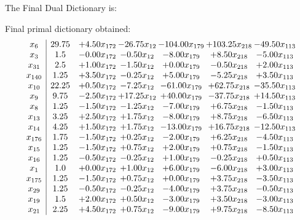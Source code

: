 \documentclass[8pt]{article}
\begin{document}
The Final Dual Dictionary is: 

 Final primal dictionary obtained: 
\[\begin{array}{c| c c@{\hskip 2pt} c@{\hskip 2pt} c@{\hskip 2pt} c@{\hskip 2pt} c@{\hskip 2pt} }
 x_{6}   &  29.75 & +  4.50 x_{172} & -26.75 x_{12} & -104.00 x_{179} & + 103.25 x_{218} & -49.50 x_{113}\\
 x_{3}   &  1.5 & -0.00 x_{172} & -0.50 x_{12} & -8.00 x_{179} & +  8.50 x_{218} & -5.00 x_{113}\\
 x_{31}   &  2.5 & +  1.00 x_{172} & -1.50 x_{12} & +  0.00 x_{179} & -0.50 x_{218} & +  2.00 x_{113}\\
 x_{140}   &  1.25 & +  3.50 x_{172} & -0.25 x_{12} & +  5.00 x_{179} & -5.25 x_{218} & +  3.50 x_{113}\\
 x_{10}   &  22.25 & +  0.50 x_{172} & -7.25 x_{12} & -61.00 x_{179} & + 62.75 x_{218} & -35.50 x_{113}\\
 x_{9}   &  9.75 & -2.50 x_{172} & + 17.25 x_{12} & + 40.00 x_{179} & -37.75 x_{218} & + 14.50 x_{113}\\
 x_{8}   &  1.25 & -1.50 x_{172} & -1.25 x_{12} & -7.00 x_{179} & +  6.75 x_{218} & -1.50 x_{113}\\
 x_{13}   &  3.25 & +  2.50 x_{172} & +  1.75 x_{12} & -8.00 x_{179} & +  8.75 x_{218} & -6.50 x_{113}\\
 x_{14}   &  4.25 & +  1.50 x_{172} & +  1.75 x_{12} & -13.00 x_{179} & + 16.75 x_{218} & -12.50 x_{113}\\
 x_{176}   &  1.75 & -1.50 x_{172} & +  0.25 x_{12} & -2.00 x_{179} & +  6.25 x_{218} & -4.50 x_{113}\\
 x_{15}   &  1.25 & -1.50 x_{172} & +  0.75 x_{12} & +  2.00 x_{179} & +  0.75 x_{218} & -1.50 x_{113}\\
 x_{16}   &  1.25 & -0.50 x_{172} & -0.25 x_{12} & +  1.00 x_{179} & -0.25 x_{218} & +  0.50 x_{113}\\
 x_{1}   &  1.0 & +  0.00 x_{172} & +  1.00 x_{12} & +  6.00 x_{179} & -6.00 x_{218} & +  3.00 x_{113}\\
 x_{175}   &  1.25 & -1.50 x_{172} & +  0.75 x_{12} & +  0.00 x_{179} & +  3.75 x_{218} & -3.50 x_{113}\\
 x_{29}   &  1.25 & -0.50 x_{172} & -0.25 x_{12} & -4.00 x_{179} & +  3.75 x_{218} & -0.50 x_{113}\\
 x_{19}   &  1.5 & +  2.00 x_{172} & +  0.50 x_{12} & -3.00 x_{179} & +  3.50 x_{218} & -3.00 x_{113}\\
 x_{21}   &  2.25 & +  4.50 x_{172} & +  0.75 x_{12} & -9.00 x_{179} & +  9.75 x_{218} & -8.50 x_{113}\\

\end{array}\]
\end{document}
